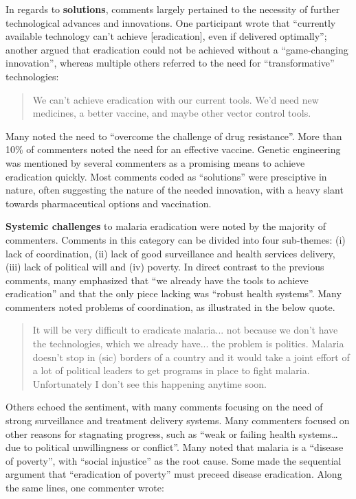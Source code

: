 \documentclass[]{article}
\begin{document}
In regards to \textbf{solutions}, comments largely pertained to the
necessity of further technological advances and innovations. One
participant wrote that ``currently available technology can't achieve
{[}eradication{]}, even if delivered optimally''; another argued that
eradication could not be achieved without a ``game-changing
innovation'', whereas multiple others referred to the need for
``transformative'' technologies:

\begin{quote}
We can't achieve eradication with our current tools. We'd need new medicines, a better vaccine, and maybe other vector control tools.
\end{quote}

Many noted the need to ``overcome the challenge of drug resistance''.
More than 10\% of commenters noted the need for an effective vaccine.
Genetic engineering was mentioned by several commenters as a promising
means to achieve eradication quickly. Most comments coded as
``solutions'' were presciptive in nature, often suggesting the nature of
the needed innovation, with a heavy slant towards pharmaceutical options
and vaccination.

\textbf{Systemic challenges} to malaria eradication were noted by the
majority of commenters. Comments in this category can be divided into
four sub-themes: (i) lack of coordination, (ii) lack of good
surveillance and health services delivery, (iii) lack of political will
and (iv) poverty. In direct contrast to the previous comments, many
emphasized that ``we already have the tools to achieve eradication'' and
that the only piece lacking was ``robust health systems''. Many
commenters noted problems of coordination, as illustrated in the below
quote.

\begin{quote}
It will be very difficult to eradicate malaria... not because we don't have the technologies, which we already have... the problem is politics. Malaria doesn't stop in (sic) borders of a country and it would take a joint effort of a lot of political leaders to get programs in place to fight malaria. Unfortunately I don't see this happening anytime soon.
\end{quote}

Others echoed the sentiment, with many comments focusing on the need of
strong surveillance and treatment delivery systems. Many commenters
focused on other reasons for stagnating progress, such as ``weak or
failing health systems\ldots{}due to political unwillingness or
conflict''. Many noted that malaria is a ``disease of poverty'', with
``social injustice'' as the root cause. Some made the sequential
argument that ``eradication of poverty'' must preceed disease
eradication. Along the same lines, one commenter wrote:
\end{document}
